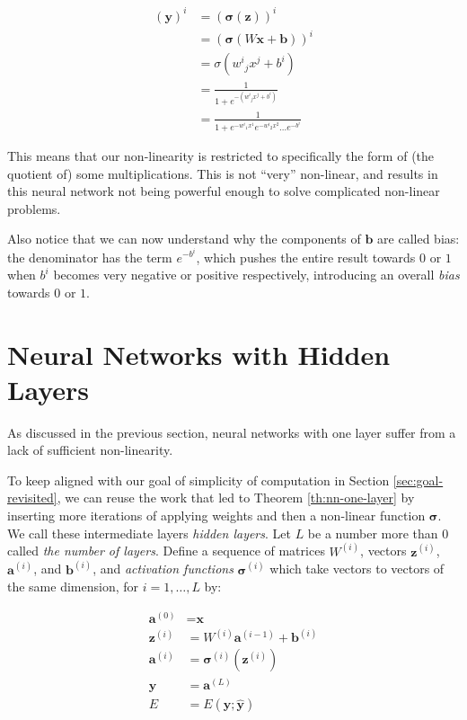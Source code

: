 \documentclass[a4paper]{article}
\theoremstyle{plain} %
\theoremstyle{definition} %
\numberwithin{equation}{subsection}
\newcommand{\vx}{{\textbf{x}}}
\newcommand{\vy}{{\textbf{y}}}
\newcommand{\vz}{{\textbf{z}}}
\newcommand{\va}{{\textbf{a}}}
\newcommand{\vb}{{\textbf{b}}}
\newcommand{\vsigma}{{\bm{\sigma}}} %
\newcommand{\vyh}{{\widehat{\textbf{y}}}}
\begin{document}
\begin{align*}
  (\vy)^i &= (\vsigma(\vz))^i \\
   &= (\vsigma ( W \vx + \vb))^i \\
   &= \sigma({w^i}_jx^j + b^i) \label{summing over repeated indices}\\ 
   &= \frac{1}{1+ e^{-({w^i}_jx^j + b^i) }} \\
   &= \frac{1}{1+ e^{-{w^i}_1x^1 }e^{-{w^i}_2x^2 }\dots e^{- b^i }}
\end{align*}

This means that our non-linearity is restricted to specifically the form of (the quotient of) some multiplications. 
This is not ``very'' non-linear, and results in this neural network not being powerful enough to solve complicated 
non-linear problems.

Also notice that we can now understand why the components of $\vb$ are called bias: the denominator has the term $ e^{- b^i }$, which pushes the entire result 
towards $0$ or $1$ when $b^i$ becomes very negative or positive respectively, introducing an overall \emph{bias} towards $0$ or $1$.

\newpage
\section{Neural Networks with Hidden Layers} \label{sec:nn-hidden-layer}
As discussed in the previous section, neural networks with one layer suffer from a lack of sufficient non-linearity.

To keep aligned with our goal of simplicity of computation in Section \ref{sec:goal-revisited}, we can reuse the work 
that led to Theorem \ref{th:nn-one-layer} by inserting more iterations of applying weights and then a non-linear function $\vsigma$.
We call these intermediate layers \emph{hidden layers}. Let $L$ be a number more than $0$ called \emph{the number of layers}. 
Define a sequence of matrices $W^{(i)}$, vectors $\vz^{(i)} $, $\va^{(i)}$, and $\vb^{(i)}$, and \emph{activation functions} $\vsigma^{(i)}$ which take vectors to vectors of the same dimension, 
for $i = 1, \dots, L$ by:

\begin{equation}\label{eq:layer-forward-prop}
\begin{aligned}
  \va^{(0)} &= \vx \\ 
  \vz^{(i)} &= W^{(i)} \va^{(i-1)} + \vb^{(i)} \\
  \va^{(i)} &= \vsigma^{(i)} \left(\vz^{(i)}\right) \\
  \vy &= \va^{(L)} \\
  E &= E(\vy; \vyh)
\end{aligned}
\end{equation}
\end{document}
